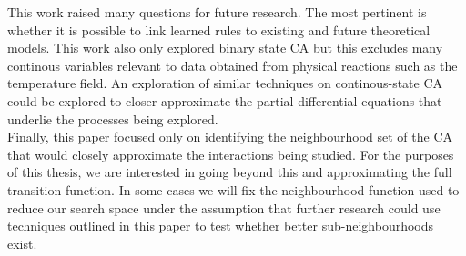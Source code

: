 This work raised many questions for future research. The most pertinent is whether it is possible to link learned rules to existing and future theoretical models. This work also only explored binary state CA but this excludes many continous variables relevant to data obtained from physical reactions such as the temperature field. An exploration of similar techniques on continous-state CA could be explored to closer approximate the partial differential equations that underlie the processes being explored.\\

Finally, this paper focused only on identifying the neighbourhood set of the CA that would closely approximate the interactions being studied. For the purposes of this thesis, we are interested in going beyond this and approximating the full transition function. In some cases we will fix the neighbourhood function used to reduce our search space under the assumption that further research could use techniques outlined in this paper to test whether better sub-neighbourhoods exist.